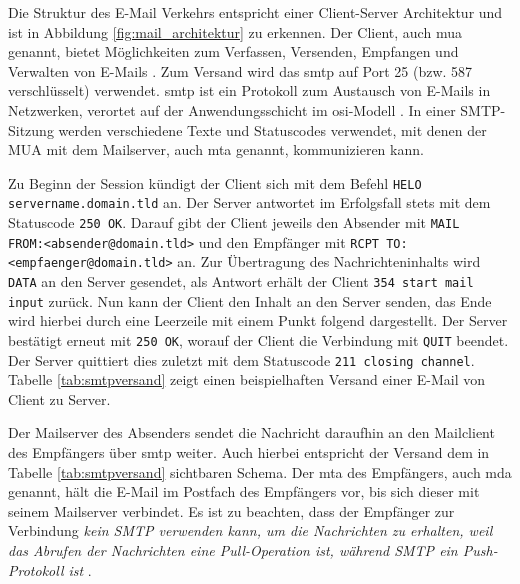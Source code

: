 \noindent Die Struktur des E-Mail Verkehrs entspricht einer Client-Server Architektur und ist in Abbildung \ref{fig:mail_architektur} zu erkennen. Der Client, auch \acrfull{mua} genannt, bietet Möglichkeiten zum Verfassen, Versenden, Empfangen und Verwalten von E-Mails \citep[S. 142 f.]{Kurose2014}. Zum Versand wird das \acrfull{smtp} auf Port 25 (bzw. 587 verschlüsselt) verwendet. \acrshort{smtp} ist ein Protokoll zum Austausch von E-Mails in Netzwerken, verortet auf der Anwendungsschicht im \acrshort{osi}-Modell \citep[S. 4 ff.]{RFC5321}. In einer SMTP-Sitzung werden verschiedene Texte und Statuscodes verwendet, mit denen der MUA mit dem Mailserver, auch \acrfull{mta} genannt, kommunizieren kann. 

Zu Beginn der Session kündigt der Client sich mit dem Befehl \texttt{HELO} \\ \texttt{servername.domain.tld} an. Der Server antwortet im Erfolgsfall stets mit dem Statuscode \texttt{250 OK}. Darauf gibt der Client jeweils den Absender mit \texttt{MAIL \\ FROM:<absender@domain.tld>} und den Empfänger mit \texttt{RCPT TO:\\<empfaenger@domain.tld>} an. Zur Übertragung des Nachrichteninhalts wird \texttt{DATA} an den Server gesendet, als Antwort erhält der Client \texttt{354 start mail input} zurück. Nun kann der Client den Inhalt an den Server senden, das Ende wird hierbei durch eine Leerzeile mit einem Punkt folgend dargestellt. Der Server bestätigt erneut mit \texttt{250 OK}, worauf der Client die Verbindung mit \texttt{QUIT} beendet. Der Server quittiert dies zuletzt mit dem Statuscode \texttt{211 closing channel}. Tabelle \ref{tab:smtpversand} zeigt einen beispielhaften Versand einer E-Mail von Client zu Server. \citep[S. 4 ff.]{RFC821}

Der Mailserver des Absenders sendet die Nachricht daraufhin an den Mailclient des Empfängers über \acrshort{smtp} weiter. Auch hierbei entspricht der Versand dem in Tabelle \ref{tab:smtpversand} sichtbaren Schema. Der \acrshort{mta} des Empfängers, auch \acrfull{mda} genannt, hält die E-Mail im Postfach des Empfängers vor, bis sich dieser mit seinem Mailserver verbindet. Es ist zu beachten, dass der Empfänger zur Verbindung \emph{\glqq[...] kein SMTP verwenden kann, um die Nachrichten zu erhalten, weil das Abrufen der Nachrichten eine Pull-Operation ist, während SMTP ein Push-Protokoll ist\grqq{}} \citep[S. 150]{Kurose2014}.

